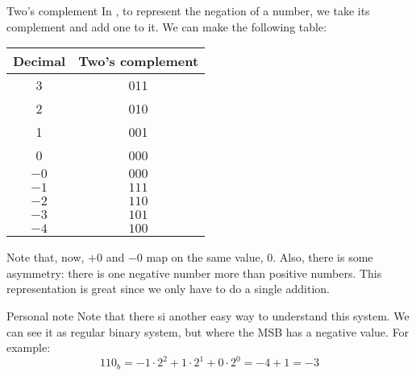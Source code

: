 \documentclass[a4paper]{article}
\begin{document}
\begin{parag}{Two's complement}
    In , to represent the negation of a number, we take its complement and add one to it. We can make the following table:
    \begin{center}
    \begin{tabular}{c|c}
        Decimal & Two's complement  \\
        \hline
        3 & 011 \\
        2 & 010 \\
        1 & 001 \\
        0 & 000 \\
        $-0$ & $000$ \\
        $-1$ & $111$ \\
        $-2$ & $110$ \\
        $-3$ & $101$ \\
        $-4$ & $100$
    \end{tabular}
    \end{center}

    Note that, now, $+0$ and $-0$ map on the same value, $0$. Also, there is some asymmetry: there is one negative number more than positive numbers. This representation is great since we only have to do a single addition.

    \begin{subparag}{Personal note}
        Note that there si another easy way to understand this system. We can see it as regular binary system, but where the MSB has a negative value. For example: 
        \[110_b = -1\cdot2^2 + 1\cdot2^1 + 0\cdot2^0 = -4 + 1 = -3\]
    \end{subparag}
    
\end{parag}
\end{document}
